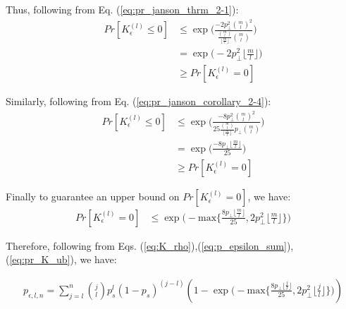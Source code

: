 Thus, following from Eq. (\ref{eq:pr_janson_thrm_2-1}):
\begin{equation}\label{eq:pr_thrm_2-1}
    \begin{aligned}
        Pr[K_\epsilon^{(l)} \leq 0] &\leq \exp\bigg(\frac{-2p_\perp^2\binom{m}{l}^2}{\frac{\binom{m}{l}}{\lfloor \frac{m}{l}\rfloor}\binom{m}{l}}\bigg)\\
        &= \exp\bigg( -2p_\perp^2 \lfloor \frac{m}{l} \rfloor \bigg)\\
        &\geq Pr[K_\epsilon^{(l)} = 0]
    \end{aligned}
\end{equation}

Similarly, following from Eq. (\ref{eq:pr_janson_corollary_2-4}):
\begin{equation}\label{eq:pr_corollary_2-4}
    \begin{aligned}
        Pr[K_\epsilon^{(l)} \leq 0] &\leq \exp\bigg(\frac{-8p_\perp^2\binom{m}{l}^2}{25\frac{\binom{m}{l}}{\lfloor \frac{m}{l} \rfloor} p_\perp \binom{m}{l}} \bigg)\\
        &= \exp\bigg(\frac{-8p_\perp \lfloor \frac{m}{l} \rfloor}{25} \bigg)\\
        &\geq Pr[K_\epsilon^{(l)} = 0]
    \end{aligned}
\end{equation}

Finally to guarantee an upper bound on $ Pr[K_\epsilon^{(l)} = 0]$, we have:
\begin{equation}\label{eq:pr_K_ub}
    \begin{aligned}
        Pr[K_\epsilon^{(l)} = 0]&\leq \exp\bigg(-\text{max}\bigg\lbrace \frac{8p_\perp \lfloor \frac{m}{l} \rfloor}{25}, 2p_\perp^2 \lfloor \frac{m}{l} \rfloor\bigg\rbrace \bigg)
    \end{aligned}
\end{equation}

Therefore, following from Eqs. (\ref{eq:K_rho}),(\ref{eq:p_epsilon_sum}),(\ref{eq:pr_K_ub}), we have:

\begin{equation}\label{eq:p_e_sum_exp}
    \begin{aligned}
        p_{\epsilon,l,n} = \sum_{j=l}^n \binom{j}{l}p_s^l(1-p_s)^{(j-l)} (1-\exp\bigg(-\text{max}\bigg\lbrace \frac{8p_\perp \lfloor \frac{j}{l} \rfloor}{25}, 2p_\perp^2 \lfloor \frac{j}{l} \rfloor\bigg\rbrace \bigg))
    \end{aligned}
\end{equation}
